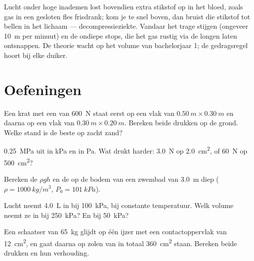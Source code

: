\begin{remark}[Decompressie]\label{rem:g10:pressure:deco}
Lucht onder hoge  inademen lost bovendien extra stikstof op in het
bloed, zoals gas in een gesloten fles frisdrank; kom je te snel boven,
dan bruist die stikstof tot bellen in het lichaam --- decompressieziekte.
Vandaar het trage stijgen (ongeveer \qty{10}{m} per minuut) en de
ondiepe stops, die het gas rustig via de longen laten ontsnappen. De
theorie wacht op het volume van bachelorjaar 1; de gedragsregel hoort
bij elke duiker.
\end{remark}

\section{Oefeningen}

\begin{exercise}[$\star$]\label{exo:g10:pressure:1}
Een krat met een  van \qty{600}{N} staat eerst op een vlak van
$\qty{0.50}{m} \times \qty{0.30}{m}$ en daarna op een vlak van
$\qty{0.30}{m} \times \qty{0.20}{m}$. Bereken beide drukken op de grond.
Welke stand is de beste op zacht zand?
\end{exercise}

\begin{exercise}[$\star$]\label{exo:g10:pressure:2}
 \qty{0.25}{MPa} uit in \unit{kPa} en in \unit{Pa}. Wat drukt
harder: \qty{3.0}{N} op \qty{2.0}{cm^2}, of \qty{60}{N} op
\qty{500}{cm^2}?
\end{exercise}

\begin{exercise}[$\star$]\label{exo:g10:pressure:3}
Bereken de  $\rho g h$ en de  op de bodem van een
zwembad van \qty{3.0}{m} diep ($\rho = \qty{1000}{kg/m^3}$,
$P_0 = \qty{101}{kPa}$).
\end{exercise}

\begin{exercise}[$\star$]\label{exo:g10:pressure:4}
Lucht neemt \qty{4.0}{L} in bij \qty{100}{kPa}, bij constante
temperatuur. Welk volume neemt ze in bij \qty{250}{kPa}? En bij
\qty{50}{kPa}?
\end{exercise}

\begin{exercise}[$\star$]\label{exo:g10:pressure:5}
Een schaatser van \qty{65}{kg} glijdt op één ijzer met een
contactoppervlak van \qty{12}{cm^2}, en gaat daarna op zolen van in
totaal \qty{360}{cm^2} staan. Bereken beide drukken en hun verhouding.
\end{exercise}

